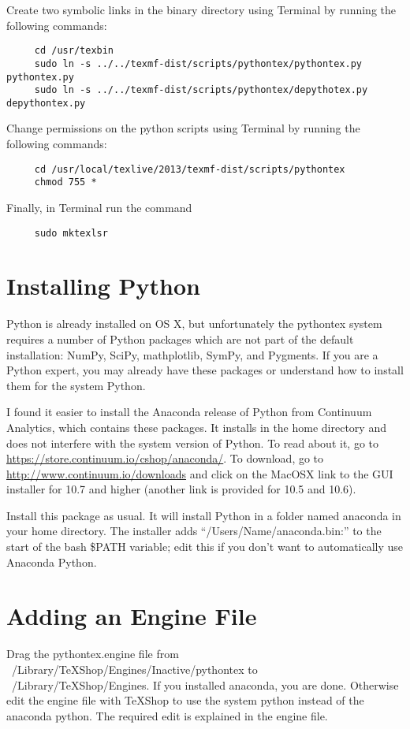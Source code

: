 \documentclass[11pt, oneside]{amsart}
\begin{document}
Create two symbolic links in the binary directory using Terminal by running the following
commands:

\begin{verbatim}
     cd /usr/texbin
     sudo ln -s ../../texmf-dist/scripts/pythontex/pythontex.py pythontex.py
     sudo ln -s ../../texmf-dist/scripts/pythontex/depythotex.py depythontex.py
\end{verbatim}

Change permissions on the python scripts using Terminal by running the following commands:

\begin{verbatim}
     cd /usr/local/texlive/2013/texmf-dist/scripts/pythontex
     chmod 755 *
\end{verbatim}

Finally, in Terminal run the command
\begin{verbatim}
     sudo mktexlsr
\end{verbatim}

\section{Installing Python}
Python is already installed on OS X, but unfortunately the pythontex system requires
a number of Python packages which are not part of the default installation: NumPy, SciPy, mathplotlib, SymPy, and Pygments. If you are a Python expert, you may already have these packages or understand how to install them for the system Python.

I found it easier to install the Anaconda release of Python from Continuum Analytics, which contains these packages. It installs in the home directory and does not interfere with the system version of Python. To read about it, go to \href{https://store.continuum.io/cshop/anaconda/}{https://store.continuum.io/cshop/anaconda/}. To download, go to \href{http://www.continuum.io/downloads}{http://www.continuum.io/downloads} and click on the MacOSX link to the GUI installer for 10.7 and higher (another link is provided for 10.5 and 10.6).

Install  this package as usual. It will install Python in a folder named anaconda in your home directory. The installer adds ``/Users/Name/anaconda.bin:'' to the start of the bash \$PATH variable;
edit this if you don't want to automatically use Anaconda Python.

\section{Adding an Engine File}
Drag the pythontex.engine file from ~/Library/TeXShop/Engines/Inactive/pythontex to ~/Library/TeXShop/Engines. If you installed anaconda, you are done. Otherwise edit the engine file with TeXShop to use the system python instead of the anaconda python. The required edit is explained in the engine file.
\end{document}
